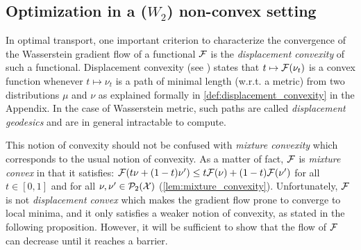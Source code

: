 


\subsection{Optimization in a ($W_2$) non-convex setting}
\label{subsection:barrier_optimization}

In optimal transport, one important criterion to characterize the convergence of the Wasserstein gradient flow of a functional ${{\mathcal F}}$ is the \textit{displacement convexity} of such a functional. Displacement convexity (see \cite{Villani:2004}) states that $t\mapsto {{\mathcal F}}(\nu_t)$ is a convex function whenever $t\mapsto\nu_t$ is a path of minimal length (w.r.t. a metric) from two distributions $\mu$ and $\nu$ as explained formally in \cref{def:displacement_convexity} in the Appendix. %
In the case of Wasserstein metric, such paths are called  \textit{displacement geodesics} and are in general intractable to compute. %


This notion of convexity should not be confused with \textit{mixture convexity} which corresponds to the usual notion of convexity. As a matter of fact, ${{\mathcal F}}$ is \textit{mixture convex} in that it satisfies: ${{\mathcal F}}(t\nu +(1-t)\nu')\leq t{{\mathcal F}}(\nu)+(1-t){{\mathcal F}}(\nu')$ for all $t\in [0,1]$ and for all $\nu,\nu'\in\mathcal{P}_2({{\mathcal X}})$ (\cref{lem:mixture_convexity}). Unfortunately, ${{\mathcal F}}$ is not \textit{displacement convex} which makes the gradient flow prone to converge to local minima, and it only satisfies a weaker notion of convexity, as stated in the following proposition. However, it will be sufficient to show that the flow of ${{\mathcal F}}$ can decrease until it reaches a barrier. %



